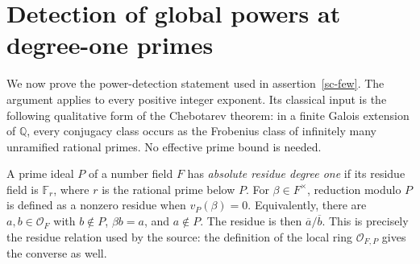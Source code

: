 \section{Detection of global powers at degree-one primes}
\label{sd-section}

We now prove the power-detection statement used in
assertion~\ref{sc-few}.  The argument applies to every positive
integer exponent.  Its classical input is the following
qualitative form of the Chebotarev theorem: in a finite
Galois extension of \(\mathbb Q\), every conjugacy class
occurs as the Frobenius class of infinitely many unramified
rational primes.\cite[Theorem 8.31]{milne-ant}
No effective prime bound is needed.

A prime ideal \(P\) of a number field \(F\) has
\emph{absolute residue degree one} if its residue field
is \(\mathbb F_r\), where \(r\) is the rational prime
below \(P\).
For \(\beta\in F^\times\), reduction modulo \(P\) is
defined as a nonzero residue when \(v_P(\beta)=0\).
Equivalently, there are \(a,b\in\mathcal O_F\) with
\(b\notin P\), \(\beta b=a\), and \(a\notin P\).
The residue is then \(\overline a/\overline b\).
This is precisely the residue relation used by the source:
the definition of the local ring
\(\mathcal O_{F,P}\) gives the converse as well.

